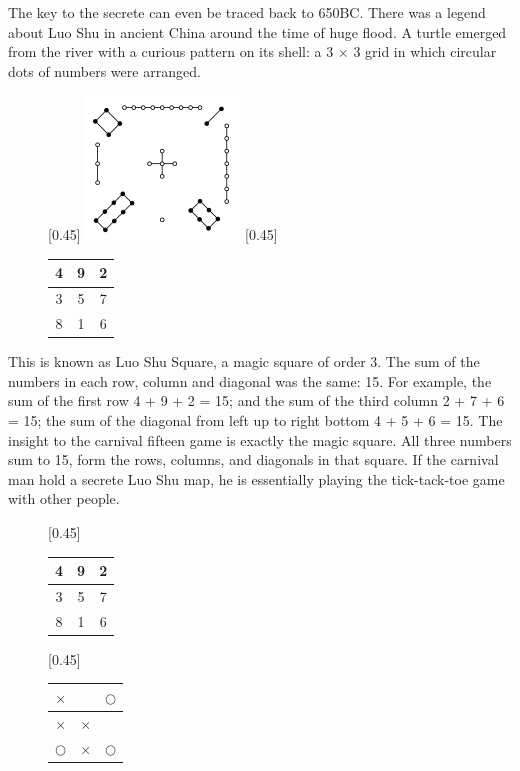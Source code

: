 \documentclass[UTF8]{article}
\begin{document}
The key to the secrete can even be traced back to 650BC. There was a legend about Luo Shu in ancient China around the time of huge flood. A turtle emerged from the river with a curious pattern on its shell: a 3 $\times$ 3 grid in which circular dots of numbers were arranged.

\begin{figure}[htbp]
 \centering
 [0.45\linewidth]{ \includegraphics[scale=0.6]{img/luo-shu.png}}
 [0.45\linewidth]{
   \begin{tabular}{|c|c|c|}
   \hline
   4 & 9 & 2 \\
   \hline
   3 & 5 & 7 \\
   \hline
   8 & 1 & 6 \\
   \hline
   \end{tabular}
   \vspace{8mm}
 }
 \captionsetup{labelformat=empty}
 \caption{}
 \label{fig:luo-shu}
\end{figure}

This is known as Luo Shu Square, a magic square of order 3. The sum of the numbers in each row, column and diagonal was the same: 15. For example, the sum of the first row 4 + 9 + 2 = 15; and the sum of the third column 2 + 7 + 6 = 15; the sum of the diagonal from left up to right bottom 4 + 5 + 6 = 15. The insight to the carnival fifteen game is exactly the magic square. All three numbers sum to 15, form the rows, columns, and diagonals in that square. If the carnival man hold a secrete Luo Shu map, he is essentially playing the tick-tack-toe game with other people.

\begin{figure}[htbp]
 \centering
 [0.45\linewidth]{
   \begin{tabular}{|c|c|c|}
   \hline
   4 & 9 & 2 \\
   \hline
   3 & 5 & 7 \\
   \hline
   8 & 1 & 6 \\
   \hline
   \end{tabular}
   \vspace{3mm}
 }
 [0.45\linewidth]{
   \begin{tabular}{c|c|c}
   $\times$ &  & $\bigcirc$ \\
   \hline
   $\times$ & $\times$ &  \\
   \hline
   $\bigcirc$ & $\times$ & $\bigcirc$ \\
   \end{tabular}
   \vspace{3mm}
 }
 \captionsetup{labelformat=empty}
 \caption{}
 \label{fig:bingo-magic-square}
\end{figure}
\end{document}
